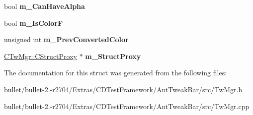 \begin{DoxyCompactItemize}
\item 
\hypertarget{struct_c_color_ext_a891a1b96636f190f0d655d72677ad1d9}{bool {\bfseries m\+\_\+\+Can\+Have\+Alpha}}\label{struct_c_color_ext_a891a1b96636f190f0d655d72677ad1d9}

\item 
\hypertarget{struct_c_color_ext_a9db18dd66f5fad96b0f5bd3fdd18fe0c}{bool {\bfseries m\+\_\+\+Is\+Color\+F}}\label{struct_c_color_ext_a9db18dd66f5fad96b0f5bd3fdd18fe0c}

\item 
\hypertarget{struct_c_color_ext_a6bc4c916c6ca6c0dae0c01f2f8d0d33b}{unsigned int {\bfseries m\+\_\+\+Prev\+Converted\+Color}}\label{struct_c_color_ext_a6bc4c916c6ca6c0dae0c01f2f8d0d33b}

\item 
\hypertarget{struct_c_color_ext_a28c21360f022f55b528d1bc2351379e4}{\hyperlink{struct_c_tw_mgr_1_1_c_struct_proxy}{C\+Tw\+Mgr\+::\+C\+Struct\+Proxy} $\ast$ {\bfseries m\+\_\+\+Struct\+Proxy}}\label{struct_c_color_ext_a28c21360f022f55b528d1bc2351379e4}

\end{DoxyCompactItemize}


The documentation for this struct was generated from the following files\+:\begin{DoxyCompactItemize}
\item 
bullet/bullet-\/2.-\/r2704/\+Extras/\+C\+D\+Test\+Framework/\+Ant\+Tweak\+Bar/src/Tw\+Mgr.\+h\item 
bullet/bullet-\/2.-\/r2704/\+Extras/\+C\+D\+Test\+Framework/\+Ant\+Tweak\+Bar/src/Tw\+Mgr.\+cpp\end{DoxyCompactItemize}
